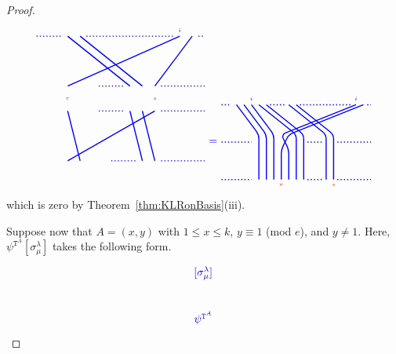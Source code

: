 \documentclass[twoside,11pt,reqno,letter]{amsart}
\numberwithin{equation}{section}
\theoremstyle{definition}  %
\newcommand{\0}{{\bar 0}}
\newcommand{\1}{{\bar 1}}
\newcommand{\la}{\lambda}
\newcommand{\si}{\sigma}
\def\T{{\mathtt T}}
\newenvironment{braid}{%
  \begin{tikzpicture}[baseline=6mm,blue,line width=1pt, scale=0.4,
                      draw/.append style={rounded corners},
                      every node/.append style={font=\tiny}]%
  }{\end{tikzpicture}
}
\begin{document}
{\begin{proof}
\[\begin{braid}
    \draw[dotted](3.5,10)--(5.5,10);
    \draw[dotted](8.5,6)--(10.5,6);
    \draw[dotted](8.5,4)--(10.5,4);
    \draw[dotted](9.5,0)--(11.5,0);

    \draw(6,10)--(11,6); \draw(11,4)--(12,0);
    \draw(7,10)--(12,6); \draw(12,4)--(13,0);

    \draw[dotted](7.5,10)--(14.5,10);

    \draw(15,10)node[above]{$i$}--(6,6); \draw(6,5)node[color=red]{$r$}; \draw(6,4)--(7,0);
    \draw(16,10)--(13,6); \draw(13,5)node[color=red]{$s$}; \draw(13,4)--(6,0);

    \draw[dotted](16.5,10)--(17,10);
    \draw[dotted](13.5,6)--(17,6);
    \draw[dotted](13.5,4)--(17,4);
    \draw[dotted](13.5,0)--(17,0);
  \end{braid}
  \begin{braid}\tikzset{scale=0.6,baseline=12mm}
    \draw(0,5)node[font=\normalsize]{$=$};
  \end{braid}
  \begin{braid}\tikzset{scale=0.6,baseline=12mm}
    \draw[dotted](-1,10)--(0,10);
    \draw[dotted](-1,5)--(3,5);
    \draw[dotted](-1,0)--(3,0);

    \draw(1,10)--(4,6)--(4,4)--(4,0);
    \draw(2,10)--(5,6)--(5,4)--(5,0);
    \draw(3,10)node[above]{$i$}--(6,6)--(6,4)--(6,0);
    \draw(4,10)--(9,6)--(9,4)--(9,0);
    \draw(5,10)--(10,6)--(10,4)--(10,0);

    \draw[dotted](5.5,10)--(7.5,10);
    \draw[dotted](10.5,5)--(12.5,5);
    \draw[dotted](10.5,0)--(12.5,0);

    \draw(8,10)--(13,6)--(13,4)--(13,0);
    \draw(9,10)--(14,6)--(14,4)--(14,0)node[below, color=red]{$s$};

    \draw[dotted](9.5,10)--(16.5,10);

    \draw(17,10)node[above]{$i$}--(7,6)--(8,4)--(8,0);
    \draw(18,10)--(8,6)--(7,4)--(7,0)node[below, color=red]{$r$};

    \draw[dotted](18.5,10)--(19,10);
    \draw[dotted](14.5,5)--(19,5);
    \draw[dotted](14.5,0)--(19,0);
  \end{braid}
\]
which is zero by Theorem~\ref{thm:KLRonBasis}(iii).





  Suppose now that $A =(x,y)$ with $1 \leq x \leq k$, $y \equiv 1$ (mod $e$), and $y \neq 1$. Here, $\psi^{\T^A} [\si^\la_\mu]$ takes the following form.
\[
  \begin{braid}\tikzset{scale=0.6,baseline=12mm}
    \draw(0,8)node[left,font=\normalsize]{$[\si^\la_\mu]$};
    \draw(0,2)node[left,font=\normalsize]{$\psi^{\T^A}$};


\end{braid}\]
\end{proof}}
\end{document}
